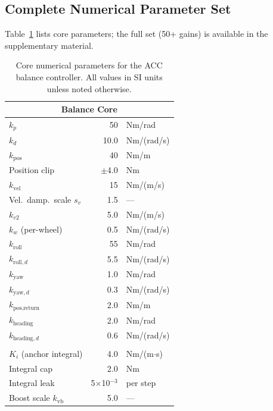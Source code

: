 \documentclass[a4paper,fleqn]{cas-dc}
\begin{document}
\subsection{Complete Numerical Parameter Set}
\label{sec:parameters}

Table~\ref{tab:parameters} lists core parameters; the full set (50+ gains) is available in the supplementary material.

\begin{table}[pos=!tbp]
\centering
\footnotesize
\caption{Core numerical parameters for the ACC balance controller. All values in SI units unless noted otherwise.}
\label{tab:parameters}
\begin{tabular}{@{}p{2.8cm}rp{1.8cm}@{}}
\toprule
\multicolumn{3}{c}{\textbf{Balance Core}} \\
\midrule
$k_p$                      & 50      & Nm/rad \\
$k_d$                      & 10.0    & Nm/(rad/s) \\
$k_{\text{pos}}$           & 40      & Nm/m \\
Position clip              & $\pm$4.0 & Nm \\
$k_{\text{vel}}$           & 15      & Nm/(m/s) \\
Vel.\ damp.\ scale $s_v$   & 1.5     & --- \\
$k_{v2}$                   & 5.0     & Nm/(m/s) \\
$k_w$ (per-wheel)          & 0.5     & Nm/(rad/s) \\
$k_{\text{roll}}$          & 55      & Nm/rad \\
$k_{\text{roll},d}$        & 5.5     & Nm/(rad/s) \\
$k_{\text{yaw}}$           & 1.0     & Nm/rad \\
$k_{\text{yaw},d}$         & 0.3     & Nm/(rad/s) \\
$k_{\text{pos,return}}$    & 2.0     & Nm/m \\
$k_{\text{heading}}$       & 2.0     & Nm/rad \\
$k_{\text{heading},d}$     & 0.6     & Nm/(rad/s) \\
\addlinespace
\multicolumn{3}{c}{\textbf{Anchor Mechanism}} \\
\addlinespace
$K_i$ (anchor integral)    & 4.0     & Nm/(m$\cdot$s) \\
Integral cap               & 2.0     & Nm \\
Integral leak              & 5$\times$10$^{-3}$ & per step \\
Boost scale $k_{\text{vb}}$& 5.0     & --- \\

\end{tabular}
\end{table}
\end{document}
